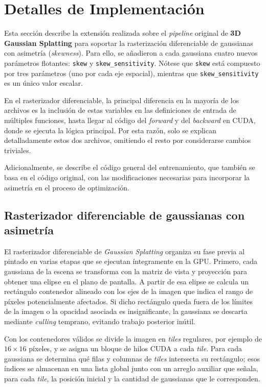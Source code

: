 \chapter{Detalles de Implementación}\label{chapter:implementation}


Esta sección describe la extensión realizada sobre el \textit{pipeline} original de \textbf{3D Gaussian Splatting} para soportar la rasterización diferenciable de gaussianas con asimetría (\textit{skewness}). Para ello, se añadieron a cada gaussiana cuatro nuevos parámetros flotantes: \texttt{skew} y \texttt{skew\_sensitivity}. Nótese que \texttt{skew} está compuesto por tres parámetros (uno por cada eje espacial), mientras que \texttt{skew\_sensitivity} es un único valor escalar.

En el rasterizador diferenciable, la principal diferencia en la mayoría de los archivos es la inclusión de estas variables en las definiciones de entrada de múltiples funciones, hasta llegar al código del \textit{forward} y del \textit{backward} en CUDA, donde se ejecuta la lógica principal. Por esta razón, solo se explican detalladamente estos dos archivos, omitiendo el resto por considerarse cambios triviales.

Adicionalmente, se describe el código general del entrenamiento, que también se basa en el código original, con las modificaciones necesarias para incorporar la asimetría en el proceso de optimización.

\section{Rasterizador diferenciable de gaussianas con asimetría}
El rasterizador diferenciable de \textit{Gaussian Splatting} organiza su fase previa al pintado en varias etapas que se ejecutan íntegramente en la GPU. Primero, cada gaussiana de la escena se transforma con la matriz de vista y proyección para obtener una elipse en el plano de pantalla. A partir de esa elipse se calcula un rectángulo contenedor alineado con los ejes de la imagen que indica el rango de píxeles potencialmente afectados. Si dicho rectángulo queda fuera de los límites de la imagen o la opacidad asociada es insignificante, la gaussiana se descarta mediante \textit{culling} temprano, evitando trabajo posterior inútil.

Con los contenedores válidos se divide la imagen en \textit{tiles} regulares, por ejemplo de $16 \times 16$ píxeles, y se asigna un bloque de hilos CUDA a cada \textit{tile}. Para cada gaussiana se determina qué filas y columnas de \textit{tiles} intersecta su rectángulo; esos índices se almacenan en una lista global junto con un arreglo auxiliar que señala, para cada \textit{tile}, la posición inicial y la cantidad de gaussianas que le corresponden. 

